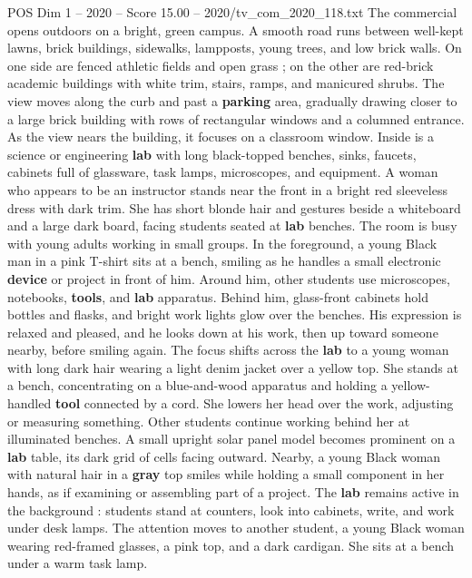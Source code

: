\begin{textsample}{POS Dim 1 – 2020 – Score 15.00 – 2020/tv\_com\_2020\_118.txt}  \label{ex:f1_pos_013}
The commercial opens outdoors on a bright, green campus.
A smooth road runs between well-kept lawns, brick buildings, sidewalks, lampposts, young trees, and low brick walls.
On one side are fenced athletic fields and open grass ; on the other are red-brick academic buildings with white trim, stairs, ramps, and manicured shrubs.
The view moves along the curb and past a \textbf{parking} area, gradually drawing closer to a large brick building with rows of rectangular windows and a columned entrance.
As the view nears the building, it focuses on a classroom window.
Inside is a science or engineering \textbf{lab} with long black-topped benches, sinks, faucets, cabinets full of glassware, task lamps, microscopes, and equipment.
A woman who appears to be an instructor stands near the front in a bright red sleeveless dress with dark trim.
She has short blonde hair and gestures beside a whiteboard and a large dark board, facing students seated at \textbf{lab} benches.
The room is busy with young adults working in small groups.
In the foreground, a young Black man in a pink T-shirt sits at a bench, smiling as he handles a small electronic \textbf{device} or project in front of him.
Around him, other students use microscopes, notebooks, \textbf{tools}, and \textbf{lab} apparatus.
Behind him, glass-front cabinets hold bottles and flasks, and bright work lights glow over the benches.
His expression is relaxed and pleased, and he looks down at his work, then up toward someone nearby, before smiling again.
The focus shifts across the \textbf{lab} to a young woman with long dark hair wearing a light denim jacket over a yellow top.
She stands at a bench, concentrating on a blue-and-wood apparatus and holding a yellow-handled \textbf{tool} connected by a cord.
She lowers her head over the work, adjusting or measuring something.
Other students continue working behind her at illuminated benches.
A small upright solar panel model becomes prominent on a \textbf{lab} table, its dark grid of cells facing outward.
Nearby, a young Black woman with natural hair in a \textbf{gray} top smiles while holding a small component in her hands, as if examining or assembling part of a project.
The \textbf{lab} remains active in the background : students stand at counters, look into cabinets, write, and work under desk lamps.
The attention moves to another student, a young Black woman wearing red-framed glasses, a pink top, and a dark cardigan.
She sits at a bench under a warm task lamp.

\end{textsample}
